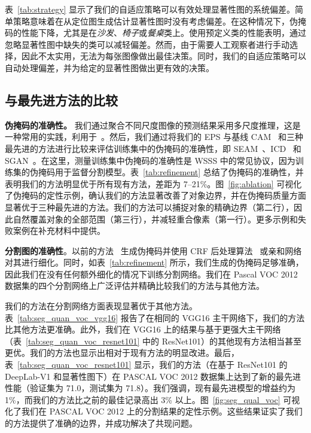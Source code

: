 \documentclass[final]{cvpr}
\begin{document}



表~\ref{tab:strategy} 显示了我们的自适应策略可以有效处理显著性图的系统偏差。简单策略意味着在从定位图生成估计显著性图时没有考虑偏差。在这种情况下，伪掩码的性能下降，尤其是在\emph{沙发}、\emph{椅子}或\emph{餐桌}类上。使用预定义类的性能表明，通过忽略显著性图中缺失的类可以减轻偏差。然而，由于需要人工观察者进行手动选择，因此不太实用，无法为每张图像做出最佳决策。同时，我们的自适应策略可以自动处理偏差，并为给定的显著性图做出更有效的决策。

\subsection{与最先进方法的比较}
\label{section5.3}

\noindent \textbf{伪掩码的准确性。} 我们通过聚合不同尺度图像的预测结果采用多尺度推理，这是一种常用的实践，利用于~\cite{ahn2018learning,wang2020self}。然后，我们通过将我们的 EPS 与基线 CAM~\cite{zhou2016learning} 和三种最先进的方法进行比较来评估训练集中的伪掩码的准确性，即 SEAM~\cite{wang2020self}、ICD~\cite{fan2020learning} 和 SGAN~\cite{yao2020saliency}。在这里，测量训练集中伪掩码的准确性是 WSSS 中的常见协议，因为训练集的伪掩码用于监督分割模型。表~\ref{tab:refinement} 总结了伪掩码的准确性，并表明我们的方法明显优于所有现有方法，差距为 7--21\%。图~\ref{fig:ablation} 可视化了伪掩码的定性示例，确认我们的方法显著改善了对象边界，并在伪掩码质量方面显著优于三种最先进的方法。我们的方法可以捕捉对象的精确边界（第二行），因此自然覆盖对象的全部范围（第三行），并减轻重合像素（第一行）。更多示例和失败案例在补充材料中提供。





\vspace{1mm}
\noindent \textbf{分割图的准确性}。以前的方法~\cite{ahn2018learning, fan2020learning, wang2020self} 生成伪掩码并使用 CRF 后处理算法~\cite{krahenbuhl2011efficient} 或亲和网络~\cite{ahn2018learning} 对其进行细化。同时，如表~\ref{tab:refinement} 所示，我们生成的伪掩码足够准确，因此我们在没有任何额外细化的情况下训练分割网络。我们在 Pascal VOC 2012 数据集的四个分割网络上广泛评估并精确比较我们的方法与其他方法。



我们的方法在分割网络方面表现显著优于其他方法。表~\ref{tab:seg_quan_voc_vgg16} 报告了在相同的 VGG16 主干网络下，我们的方法比其他方法更准确。此外，我们在 VGG16 上的结果与基于更强大主干网络（\ie 表~\ref{tab:seg_quan_voc_resnet101} 中的 ResNet101）的其他现有方法相当甚至更优。我们的方法也显示出相对于现有方法的明显改进。最后，表~\ref{tab:seg_quan_voc_resnet101} 显示，我们的方法（在基于 ResNet101 的 DeepLab-V1 和显著性图下）在 PASCAL VOC 2012 数据集上达到了新的最先进性能（验证集为 71.0，测试集为 71.8）。我们强调，现有最先进模型的增益约为 1\%，而我们的方法比之前的最佳记录高出 3\% 以上。图~\ref{fig:seg_qual_voc} 可视化了我们在 PASCAL VOC 2012 上的分割结果的定性示例。这些结果证实了我们的方法提供了准确的边界，并成功解决了共现问题。
\end{document}
